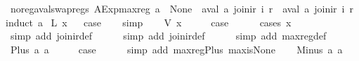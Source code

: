 \begin{isabellebody}
\endisatagproof
{\isafoldproof}%
%
\isadelimproof
\isanewline
%
\endisadelimproof
\isanewline
{}\isamarkupfalse%
\ no{\isacharunderscore}reg{\isacharunderscore}aval{\isacharunderscore}swap{\isacharunderscore}regs{\isacharcolon}\ {\isachardoublequoteopen}AExp{\isachardot}max{\isacharunderscore}reg\ a\ {\isacharequal}\ None\ {\isasymLongrightarrow}\ aval\ a\ {\isacharparenleft}join{\isacharunderscore}ir\ i\ r{\isacharparenright}\ {\isacharequal}\ aval\ a\ {\isacharparenleft}join{\isacharunderscore}ir\ i\ r{\isacharprime}{\isacharparenright}{\isachardoublequoteclose}\isanewline
%
\isadelimproof
%
\endisadelimproof
%
\isatagproof
{}\isamarkupfalse%
{\isacharparenleft}induct\ a{\isacharparenright}\isanewline
{}\isamarkupfalse%
\ {\isacharparenleft}L\ x{\isacharparenright}\isanewline
{}\isamarkupfalse%
\ \isamarkupfalse%
\ {\isacharquery}case\isanewline
\ \ \isamarkupfalse%
\ simp\isanewline
{}\isamarkupfalse%
\isanewline
\ \ \isamarkupfalse%
\ {\isacharparenleft}V\ x{\isacharparenright}\isanewline
\ \ \isamarkupfalse%
\ \isamarkupfalse%
\ {\isacharquery}case\isanewline
\ \ \ \ \isamarkupfalse%
\ {\isacharparenleft}cases\ x{\isacharparenright}\isanewline
\ \ \ \ \ \isamarkupfalse%
\ {\isacharparenleft}simp\ add{\isacharcolon}\ join{\isacharunderscore}ir{\isacharunderscore}def{\isacharparenright}\isanewline
\ \ \ \ \isamarkupfalse%
\ {\isacharparenleft}simp\ add{\isacharcolon}\ join{\isacharunderscore}ir{\isacharunderscore}def{\isacharparenright}\isanewline
\ \ \ \ \isamarkupfalse%
\ {\isacharparenleft}simp\ add{\isacharcolon}\ max{\isacharunderscore}reg{\isacharunderscore}def{\isacharparenright}\isanewline
{}\isamarkupfalse%
\isanewline
\ \ \isamarkupfalse%
\ {\isacharparenleft}Plus\ a{}\ a{}{\isacharparenright}\isanewline
\ \ \isamarkupfalse%
\ \isamarkupfalse%
\ {\isacharquery}case\isanewline
\ \ \ \ \isamarkupfalse%
\ {\isacharparenleft}simp\ add{\isacharcolon}\ max{\isacharunderscore}reg{\isacharunderscore}Plus\ max{\isacharunderscore}is{\isacharunderscore}None{\isacharparenright}\isanewline
{}\isamarkupfalse%
\isanewline
\ \ \isamarkupfalse%
\ {\isacharparenleft}Minus\ a{}\ a{}{\isacharparenright}\isanewline
\ \ \isamarkupfalse%
\ \isamarkupfalse%

\end{isabellebody}
